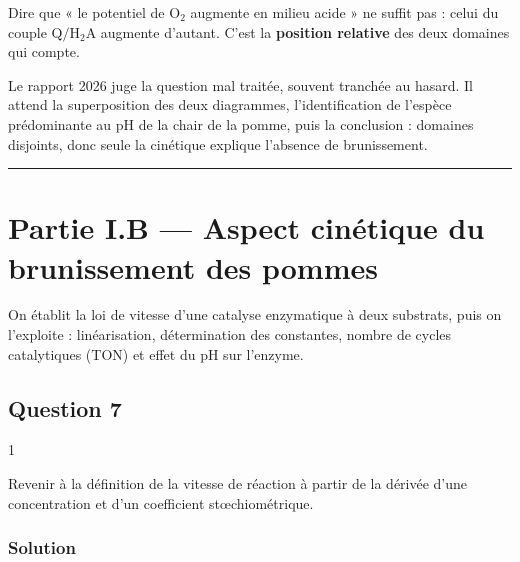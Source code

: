 \documentclass[11pt,a4paper]{article}
\begin{document}
\begin{piege}

Dire que « le potentiel de \(\mathrm{O_2}\) augmente en milieu acide » ne suffit pas : celui du couple \(\mathrm{Q/H_2A}\) augmente d'autant. C'est la \textbf{position relative} des deux domaines qui compte.

\end{piege}

\begin{jury}

Le rapport 2026 juge la question mal traitée, souvent tranchée au hasard. Il attend la superposition des deux diagrammes, l'identification de l'espèce prédominante au pH de la chair de la pomme, puis la conclusion : domaines disjoints, donc seule la cinétique explique l'absence de brunissement.

\end{jury}

\begin{center}\rule{0.5\linewidth}{0.5pt}\end{center}

\hypertarget{partie-i.b-aspect-cinuxe9tique-du-brunissement-des-pommes}{%
\section{Partie I.B --- Aspect cinétique du brunissement des pommes}\label{partie-i.b-aspect-cinuxe9tique-du-brunissement-des-pommes}}

On établit la loi de vitesse d'une catalyse enzymatique à deux substrats, puis on l'exploite : linéarisation, détermination des constantes, nombre de cycles catalytiques (TON) et effet du pH sur l'enzyme.

\hypertarget{question-7}{%
\subsection{Question 7}\label{question-7}}

\begin{indication}{1}

Revenir à la définition de la vitesse de réaction à partir de la dérivée d'une concentration et d'un coefficient stœchiométrique.

\end{indication}

\hypertarget{solution-6}{%
\subsubsection{Solution}\label{solution-6}}
\end{document}
